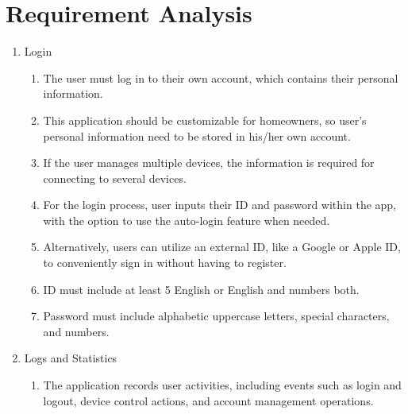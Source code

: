 \documentclass[11pt, conference]{IEEEtran}
\begin{document}
\section{\Large{Requirement Analysis}}
\begin{enumerate}[label=\arabic*.]
    \item {\large{Login}}\\

    \begin{enumerate}[label*={\arabic*.},ref=\theenumi.\arabic*]
    \setlength{\itemindent}{0.5cm}
        \item The user must log in to their own account, which contains their personal information.\\
        
        \item This application should be customizable for homeowners, so user’s personal information need to be stored in his/her own account.\\
        
        \item If the user manages multiple devices, the information is required for connecting to several devices.\\
        
        
        \item For the login process, user inputs their ID and password within the app, with the option to use the auto-login feature when needed.\\
        
        \item Alternatively, users can utilize an external ID, like a Google or Apple ID, to conveniently sign in without having to register.\\
    
        \item ID must include at least 5 English or English and numbers both.\\
    
        \item Password must include alphabetic uppercase letters, special characters, and numbers.\\
    \end{enumerate}

    \item {\large{Logs and Statistics}}\\
    \begin{enumerate}[label*={\arabic*.},ref=\theenumi.\arabic*]
    \setlength{\itemindent}{0.5cm}
        \item The application records user activities, including events such as login and logout, device control actions, and account management operations. \\
        

\end{enumerate}
\end{enumerate}
\end{document}
